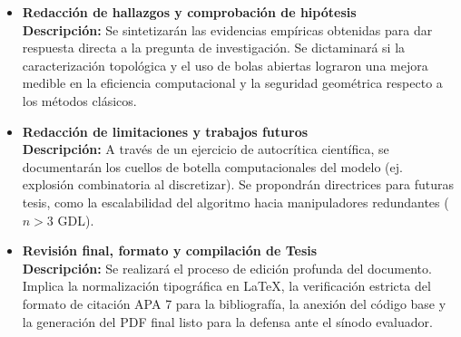 \begin{itemize}
    \item \textbf{Redacción de hallazgos y comprobación de hipótesis} \\
    \textbf{Descripción:} Se sintetizarán las evidencias empíricas obtenidas para dar respuesta directa a la pregunta de investigación. Se dictaminará si la caracterización topológica y el uso de bolas abiertas lograron una mejora medible en la eficiencia computacional y la seguridad geométrica respecto a los métodos clásicos.

    \item \textbf{Redacción de limitaciones y trabajos futuros} \\
    \textbf{Descripción:} A través de un ejercicio de autocrítica científica, se documentarán los cuellos de botella computacionales del modelo (ej. explosión combinatoria al discretizar). Se propondrán directrices para futuras tesis, como la escalabilidad del algoritmo hacia manipuladores redundantes ($n > 3$ GDL).

    \item \textbf{Revisión final, formato y compilación de Tesis} \\
    \textbf{Descripción:} Se realizará el proceso de edición profunda del documento. Implica la normalización tipográfica en LaTeX, la verificación estricta del formato de citación APA 7 para la bibliografía, la anexión del código base y la generación del PDF final listo para la defensa ante el sínodo evaluador.
\end{itemize}

